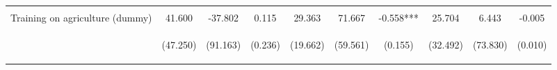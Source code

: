 \begin{center}
\begin{tabular}{lccccccccc}
\vspace{4pt} & \begin{footnotesize}[0.726]\end{footnotesize} & \begin{footnotesize}[0.688]\end{footnotesize} & \begin{footnotesize}[0.000]\end{footnotesize} & \begin{footnotesize}[0.762]\end{footnotesize} & \begin{footnotesize}[0.249]\end{footnotesize} & \begin{footnotesize}[0.905]\end{footnotesize} & \begin{footnotesize}[0.927]\end{footnotesize} & \begin{footnotesize}[0.014]\end{footnotesize} & \begin{footnotesize}[0.060]\end{footnotesize} \\
Training on agriculture (dummy) & 41.600 & -37.802 & 0.115 & 29.363 & 71.667 & -0.558*** & 25.704 & 6.443 & -0.005 \\
 & \begin{footnotesize}(47.250)\end{footnotesize} & \begin{footnotesize}(91.163)\end{footnotesize} & \begin{footnotesize}(0.236)\end{footnotesize} & \begin{footnotesize}(19.662)\end{footnotesize} & \begin{footnotesize}(59.561)\end{footnotesize} & \begin{footnotesize}(0.155)\end{footnotesize} & \begin{footnotesize}(32.492)\end{footnotesize} & \begin{footnotesize}(73.830)\end{footnotesize} & \begin{footnotesize}(0.010)\end{footnotesize} \\

\end{tabular}
\end{center}

